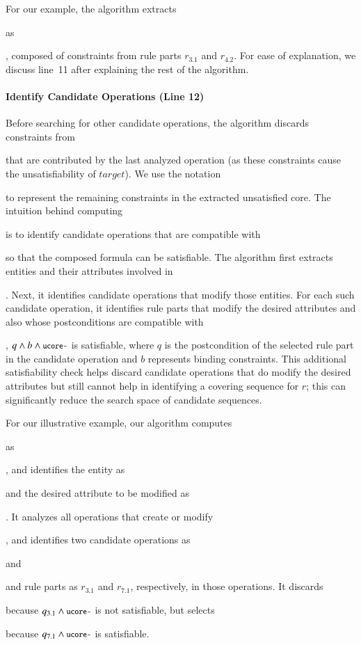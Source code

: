 For our example, the algorithm extracts \subject{ucore} as \subject{ord.total =
  0 $\wedge$ ord.total > 0}, composed of constraints from rule parts $r_{3.1}$
and $r_{4.2}$. For ease of explanation, we discuss line~11 after explaining the
rest of the algorithm.


\vskip -7pt
\paragraph*{Identify Candidate Operations (Line 12)}
Before searching for other candidate operations, the algorithm discards
constraints from \subject{ucore} that are contributed by the last analyzed
operation (as these constraints cause the unsatisfiability of $target$).  We use
the notation \subject{ucore-} to represent the remaining constraints in the
extracted unsatisfied core. The intuition behind computing \subject{ucore-} is
to identify candidate operations that are compatible with \subject{ucore-} so
that the composed formula can be satisfiable.  The algorithm first extracts
entities and their attributes involved in \subject{ucore-}. Next, it identifies
candidate operations that modify those entities.  For each such candidate
operation, it identifies rule parts that modify the desired attributes and also
whose postconditions are compatible with \subject{ucore-}, \ie{} $q \wedge b
\wedge \subject{ucore-}$ is satisfiable, where $q$ is the postcondition of the
selected rule part in the candidate operation and $b$ represents binding
constraints.  This additional satisfiability check helps discard candidate
operations that do modify the desired attributes but still cannot help in
identifying a covering sequence for $r$; this can significantly reduce the
search space of candidate sequences.

For our illustrative example, our algorithm computes \subject{ucore-} as
\subject{ord.total > 0}, and identifies the entity as \subject{Order} and the
desired attribute to be modified as \subject{total}. It analyzes all operations
that create or modify \subject{Order}, and identifies two candidate operations
as \subject{CreateOrder} and \subject{AddItemToOrder} and rule parts as
$r_{3.1}$ and $r_{7.1}$, respectively, in those operations.  It discards
\subject{CreateOrder} because $q_{3.1} \wedge \subject{ucore-}$ is not
satisfiable, but selects \subject{AddItemToOrder} because $q_{7.1} \wedge
\subject{ucore-}$ is satisfiable.

